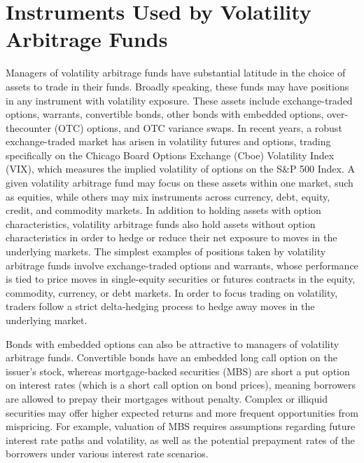 \documentclass[11pt]{article}
\begin{document}
\section*{Instruments Used by Volatility Arbitrage Funds}
Managers of volatility arbitrage funds have substantial latitude in the choice of assets to trade in their funds. Broadly speaking, these funds may have positions in any instrument with volatility exposure. These assets include exchange-traded options, warrants, convertible bonds, other bonds with embedded options, over-thecounter (OTC) options, and OTC variance swaps. In recent years, a robust exchange-traded market has arisen in volatility futures and options, trading specifically on the Chicago Board Options Exchange (Cboe) Volatility Index (VIX), which measures the implied volatility of options on the S\&P 500 Index. A given volatility arbitrage fund may focus on these assets within one market, such as equities, while others may mix instruments across currency, debt, equity, credit, and commodity markets. In addition to holding assets with option characteristics, volatility arbitrage funds also hold assets without option characteristics in order to hedge or reduce their net exposure to moves in the underlying markets. The simplest examples of positions taken by volatility arbitrage funds involve exchange-traded options and warrants, whose performance is tied to price moves in single-equity securities or futures contracts in the equity, commodity, currency, or debt markets. In order to focus trading on volatility, traders follow a strict delta-hedging process to hedge away moves in the underlying market.

Bonds with embedded options can also be attractive to managers of volatility arbitrage funds. Convertible bonds have an embedded long call option on the issuer's stock, whereas mortgage-backed securities (MBS) are short a put option on interest rates (which is a short call option on bond prices), meaning borrowers are allowed to prepay their mortgages without penalty. Complex or illiquid securities may offer higher expected returns and more frequent opportunities from mispricing. For example, valuation of MBS requires assumptions regarding future interest rate paths and volatility, as well as the potential prepayment rates of the borrowers under various interest rate scenarios.
\end{document}
